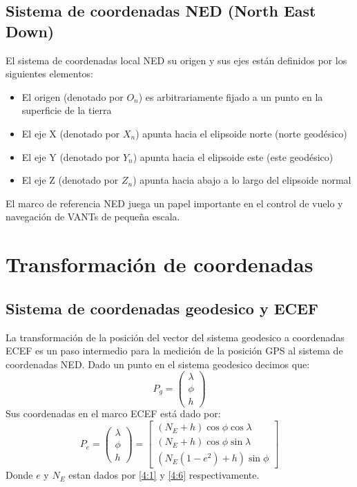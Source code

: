 \documentclass[]{report}
\begin{document}
\subsection{Sistema de coordenadas NED (North East Down)}
El sistema de coordenadas local NED su origen y sus ejes están definidos por los siguientes elementos:
\begin{itemize}
	\item El origen (denotado por $O_{n}$) es arbitrariamente fijado a un punto en la superficie de la tierra
	\item El eje X (denotado por $X_{n}$) apunta hacia el elipsoide norte (norte geodésico)
	\item  El eje Y (denotado por $Y_{n}$) apunta hacia el elipsoide este (este geodésico)
	\item El eje Z (denotado por $Z_{n}$) apunta hacia abajo a lo largo del elipsoide normal
\end{itemize}
El marco de referencia NED juega un papel importante en el control de vuelo y navegación de VANTs de pequeña escala.

\section{Transformación de coordenadas}
\subsection{Sistema de coordenadas geodesico y ECEF}
La transformación de la posición del vector del sistema geodesico a coordenadas ECEF es un paso intermedio para la medición de la posición GPS al sistema de coordenadas NED. Dado un punto en el sistema geodesico decimos que:
\begin{equation}
P_g = \begin{pmatrix} \lambda \\ \phi \\ h  \end{pmatrix}
\end{equation}
Sus coordenadas en el marco ECEF está dado por:
\begin{equation}
P_e = \begin{pmatrix} \lambda \\ \phi \\ h  \end{pmatrix} = \left[ \begin{array}{c} (N_E + h) \cos\phi\cos\lambda \\ (N_E + h) \cos\phi \sin\lambda \\ (N_E(1- e^2) + h) \sin \phi \end{array} \right]
\end{equation}
Donde $e$ y $N_E$ estan dados por \ref{4:1} y \ref{4:6} respectivamente.
\end{document}
